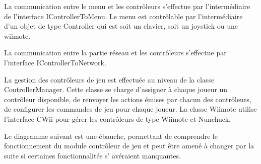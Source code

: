 

La communication entre le menu et les contrôleurs s'effectue par l'intermédiaire de l'interface IControllerToMenu. Le menu est contrôlable par l'intermédiaire d'un objet de type Controller qui est soit un clavier, soit un joystick ou une wiimote.


La communication entre la partie réseau et les contrôleurs s'effectue par l'interface IControllerToNetwork.

La gestion des contrôleurs de jeu est effectuée au niveau de la classe ControllerManager. Cette classe se charge d'assigner à chaque joueur un contrôleur disponible, de renvoyer les actions émises par chacun des contrôleurs, de configurer les commandes de jeu pour chaque joueur. La classe Wiimote utilise l'interface CWii pour gérer les contrôleurs de type Wiimote et Nunchuck.

Le diagramme suivant est une ébauche, permettant de comprendre le fonctionnement du module contrôleur de jeu et peut être amené à changer par la suite si certaines fonctionnalités s' avéraient manquantes.
